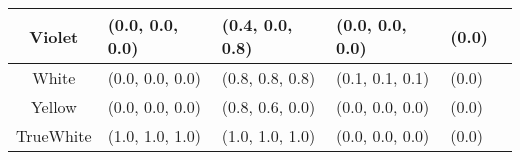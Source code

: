 \begin{table}[H]
\begin{small}
\begin{center}
\begin{tabular}{|c||l|l|l|l|l|}
Violet & (0.0, 0.0, 0.0) & (0.4, 0.0, 0.8) & (0.0, 0.0, 0.0) & (0.0) \\ \hline
White & (0.0, 0.0, 0.0) & (0.8, 0.8, 0.8) & (0.1, 0.1, 0.1) & (0.0) \\ \hline
Yellow & (0.0, 0.0, 0.0) & (0.8, 0.6, 0.0) & (0.0, 0.0, 0.0) & (0.0) \\ \hline
TrueWhite & (1.0, 1.0, 1.0) & (1.0, 1.0, 1.0) & (0.0, 0.0, 0.0) & (0.0) \\ \hline
\end{tabular}
\end{center}
\end{small}
\end{table}
